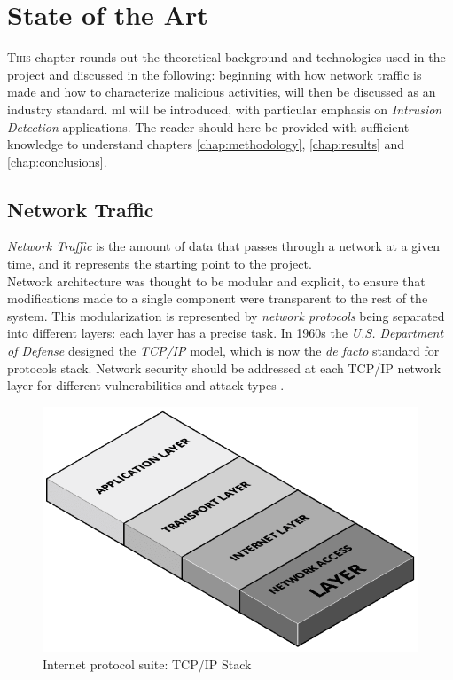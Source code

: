 \chapter{State of the Art}
\label{chap:state-of-the-art}

\lettrine[lines=4, findent=3pt, nindent=0pt]{T}{his} chapter rounds out the theoretical background and technologies used in the project and discussed in the following: beginning with how network traffic is made and how to characterize malicious activities,  will then be discussed as an industry standard. \gls{ml} will be introduced, with particular emphasis on \textit{Intrusion Detection} applications. The reader should here be provided with sufficient knowledge to understand chapters \ref{chap:methodology}, \ref{chap:results} and \ref{chap:conclusions}.


\section{Network Traffic}
\label{sec:network-traffic}

\textit{Network Traffic} is the amount of data that passes through a network at a given time, and it represents the starting point to the project. \\ Network architecture was thought to be modular and explicit, to ensure that modifications made to a single component were transparent to the rest of the system. This modularization is represented by \textit{network protocols} being separated into different layers: each layer has a precise task. In 1960s the \textit{U.S. Department of Defense} designed the \textit{TCP/IP} model, which is now the \textit{de facto} standard for protocols stack. Network security should be addressed at each TCP/IP network layer for different vulnerabilities and attack types \cite{Zaman2009}.

\begin{figure}[h!]
    \centering
    \includegraphics[scale=0.33]{assets/figures/chapter2/TCP_IP Stack.png}
    \caption{Internet protocol suite: TCP/IP Stack}
    \label{fig:TCP/IP-stack}
\end{figure}

